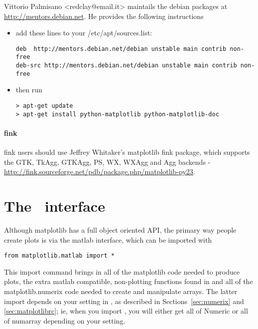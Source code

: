 \documentclass[]{book}
\begin{document}
Vittorio Palmisano <redclay@email.it> maintails the debian
packages at \url{http://mentors.debian.net}.  He provides the
following instructions

\begin{itemize}
\item       add these lines to your /etc/apt/sources.list:
\begin{verbatim}
deb  http://mentors.debian.net/debian unstable main contrib non-free 
deb-src http://mentors.debian.net/debian unstable main contrib non-free
\end{verbatim}

\item then run

\begin{verbatim}
> apt-get update
> apt-get install python-matplotlib python-matplotlib-doc
\end{verbatim}
\end{itemize}

\subsubsection{fink}
\label{sec:fink}

fink users should use Jeffrey Whitaker's matplotlib fink package,
which supports the GTK, TkAgg, GTKAgg, PS, WX, WXAgg and Agg backends
- \url{http://fink.sourceforge.net/pdb/package.php/matplotlib-py23}.



\chapter{The \matlab\ interface}
\label{cha:matlab_interface}

Although matplotlib has a full object oriented API, the primary way
people create plots is via the matlab interface, which can be imported
with

\begin{lstlisting}
from matplotlib.matlab import *
\end{lstlisting}

\noindent This import command brings in all of the matplotlib code
needed to produce plots, the extra matlab compatible, non-plotting
functions found in  and all of the
matplotlib.numerix code needed to create and manipulate arrays.  The
latter import depends on your  setting in
, as described in Sections~\ref{sec:numerix} and
\ref{sec:matplotlibrc}; ie, when you import
, you will either get all of Numeric or all
of numarray depending on your  setting.
\end{document}
